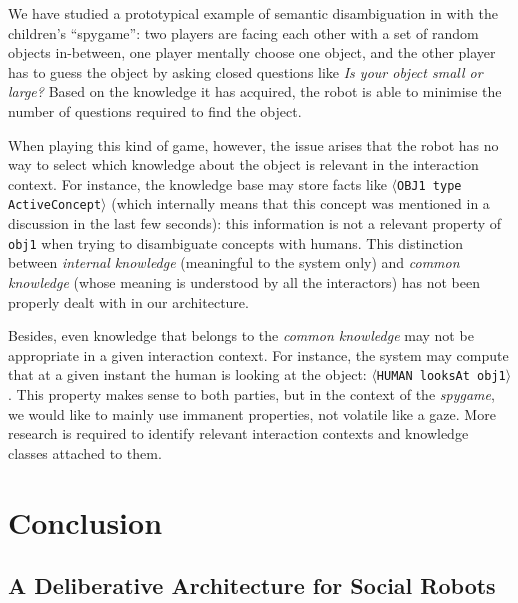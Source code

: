 \documentclass[preprint,3p,times]{elsarticle}
\newcommand{\concept}[1]{{\small \texttt{#1}}}
\newcommand{\stmt}[1]{{\footnotesize\tt$\langle$#1\relax$\rangle$}}
\begin{document}
We have studied a prototypical example of semantic disambiguation in
\cite{Ros2010b} with the children's ``spygame'': two players are facing
each other with a set of random objects in-between, one player mentally choose
one object, and the other player has to guess the object by asking closed
questions like \emph{Is your object small or large?} Based on the knowledge it
has acquired, the robot is able to minimise the number of questions required to
find the object.

When playing this kind of game, however, the issue arises that the robot has no
way to select which knowledge about the object is relevant in the interaction
context. For instance, the knowledge base may store facts like \stmt{OBJ1 type
ActiveConcept} (which internally means that this concept was mentioned in a
discussion in the last few seconds): this information is not a relevant
property of \concept{obj1} when trying to disambiguate concepts with humans.
This distinction between \emph{internal knowledge} (meaningful to
the system only) and \emph{common knowledge} (whose meaning is understood by
all the interactors) has not been properly dealt with in our architecture.

Besides, even knowledge that belongs to the \emph{common knowledge} may not be
appropriate in a given interaction context. For instance, the system may
compute that at a given instant the human is looking at the object: \stmt{HUMAN
looksAt obj1}. This property makes sense to both parties, but in the context of
the \emph{spygame}, we would like to mainly use immanent properties, not
volatile like a gaze. More research is required to identify relevant
interaction contexts and knowledge classes attached to them.

\section{Conclusion}
\label{sect|conclusion}

\subsection{A Deliberative Architecture for Social Robots}
\end{document}
